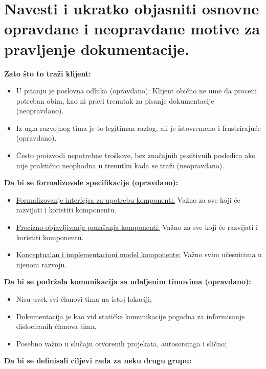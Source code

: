 \documentclass[a4paper]{article}
\begin{document}
\section{Navesti i ukratko objasniti osnovne opravdane i 
         neopravdane motive za pravljenje dokumentacije.}
  \noindent \textbf{Zato što to traži klijent:}
  \begin{itemize}
    \item U pitanju je poslovna odluka (opravdano): Klijent obično ne ume da proceni potreban obim, 
          kao ni pravi trenutak za pisanje dokumentacije (neopravdano).
    \item Iz ugla razvojnog tima je to legitiman razlog, ali je istovremeno i frustrirajuće (opravdano).
    \item Često proizvodi nepotrebne troškove, bez značajnih pozitivnih posledica ako nije 
          praktično neophodna u trenutku kada se traži (neopravdano).
  \end{itemize}
  \textbf{Da bi se formalizovale specifikacije (opravdano):}
  \begin{itemize}
    \item \underline{Formalizovanje interfejsa za upotrebu komponenti:} 
          Važno za sve koji će razvijati i koristiti komponentu.
    \item \underline{Precizno objavljivanje ponašanja komponenti:}
          Važno za sve koji će razvijati i koristiti komponentu.
    \item \underline{Konceptualan i implementacioni model komponente:} 
          Važno svim učesnicima u njenom razvoju.
  \end{itemize}
  \textbf{Da bi se podržala komunikacija sa udaljenim timovima (opravdano):}
  \begin{itemize}
    \item Nisu uvek svi članovi tima na istoj lokaciji;
    \item Dokumentacija je kao vid statičke komunikacije pogodna za informisanje 
          dislociranih članova tima. 
    \item Posebno važno u slučaju otvorenih projekata, autosorsinga i slično;
  \end{itemize}
  \textbf{Da bi se definisali ciljevi rada za neku drugu grupu:}
\end{document}
